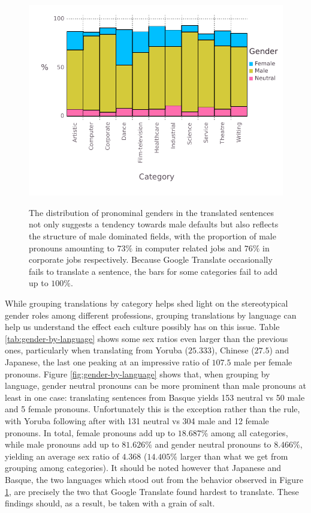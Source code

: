 \documentclass{article}
\begin{document}
\begin{figure}[H]
	\centering
	\includegraphics[width=\linewidth]{pictures/gender-by-category}
	\label{fig:gender-by-category}
	\caption{The distribution of pronominal genders in the translated sentences not only suggests a tendency towards male defaults but also reflects the structure of male dominated fields, with the proportion of male pronouns amounting to $73\%$ in computer related jobs and $76\%$ in corporate jobs respectively. Because Google Translate occasionally fails to translate a sentence, the bars for some categories fail to add up to $100\%$.}
\end{figure}

While grouping translations by category helps shed light on the stereotypical gender roles among different professions, grouping translations by language can help us understand the effect each culture possibly has on this issue. Table \ref{tab:gender-by-language} shows some sex ratios even larger than the previous ones, particularly when translating from Yoruba ($25.333$), Chinese ($27.5$) and Japanese, the last one peaking at an impressive ratio of $107.5$ male per female pronouns. Figure \ref{fig:gender-by-language} shows that, when grouping by language, gender neutral pronouns can be more prominent than male pronouns at least in one case: translating sentences from Basque yields 153 neutral vs 50 male and 5 female pronouns. Unfortunately this is the exception rather than the rule, with Yoruba following after with 131 neutral vs 304 male and 12 female pronouns. In total, female pronouns add up to $18.687\%$ among all categories, while male pronouns add up to $81.626\%$ and gender neutral pronouns to $8.466\%$, yielding an average sex ratio of $4.368$ ($14.405\%$ larger than what we get from grouping among categories). It should be noted however that Japanese and Basque, the two languages which stood out from the behavior observed in Figure \ref{fig:gender-by-category}, are precisely the two that Google Translate found hardest to translate. These findings should, as a result, be taken with a grain of salt.
\end{document}
